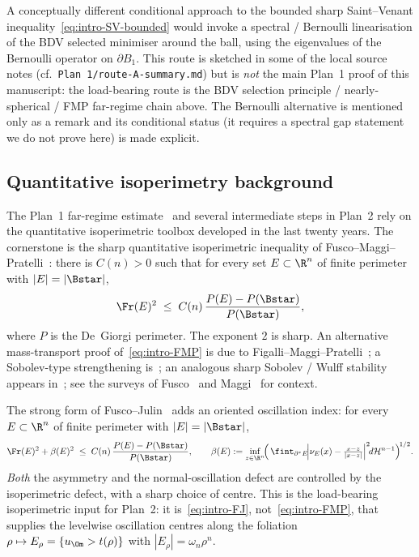 \begin{remark}\label{rem:intro-bernoulli}
A conceptually different conditional approach to the bounded sharp
Saint--Venant inequality~\eqref{eq:intro-SV-bounded} would invoke a
spectral / Bernoulli linearisation of the BDV selected minimiser
around the ball, using the eigenvalues of the Bernoulli operator on
$\partial B_1$. This route is sketched in some of the local source
notes (cf.\ \texttt{Plan~1/route-A-summary.md}) but is \emph{not} the
main Plan~1 proof of this manuscript: the load-bearing route is the
BDV selection principle / nearly-spherical / FMP far-regime chain
above. The Bernoulli alternative is mentioned only as a remark and
its conditional status (it requires a spectral gap statement we do
not prove here) is made explicit.
\end{remark}

\subsection{Quantitative isoperimetry background}
\label{ssec:intro-quant-iso}

The Plan~1 far-regime estimate~\cite[Lem.~5.1, 5.2]{BDV} and several
intermediate steps in Plan~2 rely on the quantitative isoperimetric
toolbox developed in the last twenty years. The cornerstone is the
sharp quantitative isoperimetric inequality of
Fusco--Maggi--Pratelli~\cite{FMP2008}: there is $C(n)>0$ such that for
every set $E\subset\R^n$ of finite perimeter with $|E|=|\Bstar|$,
\begin{equation}\label{eq:intro-FMP}
   \Fr(E)^2\;\le\;C(n)\,
   \frac{P(E)-P(\Bstar)}{P(\Bstar)},
\end{equation}
where $P$ is the De~Giorgi perimeter. The exponent $2$ is sharp. An
alternative mass-transport proof of~\eqref{eq:intro-FMP} is due to
Figalli--Maggi--Pratelli~\cite{FMP2010}; a Sobolev-type strengthening
is~\cite{FMP_BV}; an analogous sharp Sobolev / Wulff stability appears
in~\cite{CFMP2009,NeumayerWulff}; see the surveys of
Fusco~\cite{FuscoSurvey} and Maggi~\cite{Maggi2008} for context.

The strong form of Fusco--Julin~\cite{FJ2014} adds an oriented
oscillation index: for every $E\subset\R^n$ of finite perimeter with
$|E|=|\Bstar|$,
\begin{equation}\label{eq:intro-FJ}
   \Fr(E)^2+\beta(E)^2\;\le\;C(n)\,
   \frac{P(E)-P(\Bstar)}{P(\Bstar)},\qquad
   \beta(E):=\inf_{z\in\R^n}\!\Bigl(\,
      \fint_{\partial^*E}\!
      \Bigl|\nu_E(x)-\tfrac{x-z}{|x-z|}\Bigr|^2\!d\mathcal H^{n-1}
   \Bigr)^{\!1/2}.
\end{equation}
\emph{Both} the asymmetry and the normal-oscillation defect are
controlled by the isoperimetric defect, with a sharp choice of
centre. This is the load-bearing isoperimetric input for Plan~2: it
is~\eqref{eq:intro-FJ}, not~\eqref{eq:intro-FMP}, that supplies the
levelwise oscillation centres along the foliation
$\rho\mapsto E_\rho=\{u_\Om>t(\rho)\}$ with $|E_\rho|=\omega_n\rho^n$.

